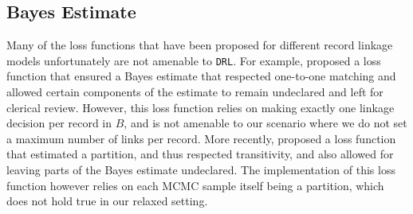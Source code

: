 \documentclass[12pt,letterpaper]{article}
\newcommand{\1}[1]{\mathbb{I}\!\left[#1\right]} %
\begin{document}






\subsection{Bayes Estimate}\label{sec:bayes-estimate} 

Many of the loss functions that have been proposed for different record linkage models unfortunately are not amenable to \texttt{DRL}. For example, \cite{sadinle_bayesian_2017} proposed a loss function that ensured a Bayes estimate that respected one-to-one matching and allowed certain components of the estimate to remain undeclared and left for clerical review. However, this loss function relies on making exactly one linkage decision per record in $B$, and is not amenable to our scenario where we do not set a maximum number of links per record. More recently, \cite{aleshin2023multifile} proposed a loss function that estimated a partition, and thus respected transitivity, and also allowed for leaving parts of the Bayes estimate undeclared. The implementation of this loss function however relies on each MCMC sample itself being a partition, which does not hold true in our relaxed setting. 
\end{document}
